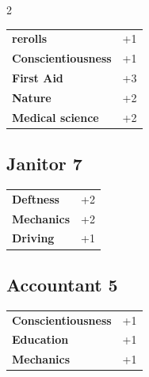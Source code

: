 \begin{multicols}{2}
\begin{tcolorbox}
\begin{tabular}{@{}ll@{}}
    \textbf{rerolls} & +1\\
    \textbf{Conscientiousness} & +1\\
    \textbf{First Aid} & +3\\
    \textbf{Nature} & +2\\
    \textbf{Medical science} & +2\\
\end{tabular}


\end{tcolorbox}

\begin{tcolorbox}
    \subsection*{Janitor \hfill \small{7 }}
    \tcblower




\begin{tabular}{@{}ll@{}}
    \textbf{Deftness} & +2\\
    \textbf{Mechanics} & +2\\
    \textbf{Driving} & +1\\
\end{tabular}


\end{tcolorbox}

\begin{tcolorbox}
    \subsection*{Accountant \hfill \small{5 }}
    \tcblower




\begin{tabular}{@{}ll@{}}
    \textbf{Conscientiousness} & +1\\
    \textbf{Education} & +1\\
    \textbf{Mechanics} & +1\\
\end{tabular}


\end{tcolorbox}
\end{multicols}
